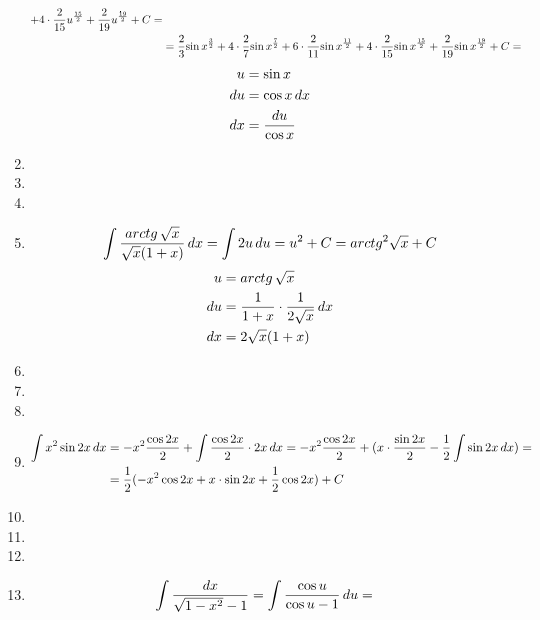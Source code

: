 \begin{enumerate}
\begin{paracol}{2}
\begin{align*}
      + 4\cdot \frac{2}{15}{u}^{\frac{15}{2}} + \frac{2}{19}{u}^{\frac{19}{2}} + C = \\
    &= \frac{2}{3}{\sin{x}}^{\frac{3}{2}} + 4\cdot \frac{2}{7}{\sin{x}}^{\frac{7}{2}} + 6\cdot \frac{2}{11}{\sin{x}}^{\frac{11}{2}}
      + 4\cdot \frac{2}{15}{\sin{x}}^{\frac{15}{2}} + \frac{2}{19}{\sin{x}}^{\frac{19}{2}} + C = \\
  \end{align*}
  \switchcolumn
  \begin{align*}
    u  &= \sin{x} \\
    du &= \cos{x}\,dx \\
    dx &= \dfrac{du}{\cos{x}}
  \end{align*}
\end{paracol}
  \item %
  \item %
  \item %
  \item %
\begin{paracol}{2}
  \begin{align*}
    \int\dfrac{arctg\,\sqrt{x}}{\sqrt{x} (1+x)}\,dx =
    \int 2u\,du = u^2 + C = arctg^2 \sqrt{x} + C
  \end{align*}
  \switchcolumn%
  \begin{align*}
    u  &= arctg\,\sqrt{x} \\
    du &= \frac{1}{1+x}\cdot \frac{1}{2\sqrt{x}} \,dx \\
    dx &= 2\sqrt{x}(1+x) 
  \end{align*}
\end{paracol}
  \item %
  \item %
  \item %
  \item %
\begin{align*}
  \int x^2 \sin{2x}\,dx 
  &= - x^2 \frac{\cos{2x}}{2} + \int\frac{\cos{2x}}{2}\cdot 2x\,dx =
     - x^2 \frac{\cos{2x}}{2} + (x\cdot \frac{\sin{2x}}{2} - \frac{1}{2}\int\sin{2x}\,dx) = \\
  &= \frac{1}{2}(-x^2 \cos{2x} + x\cdot \sin{2x} + \frac{1}{2}\cos{2x}) + C
\end{align*}
  \item %
  \item %
  \item %
  \item %
\begin{paracol}{2}
\begin{align*}
  &\int \frac{dx}{\sqrt{1-x^2}-1} = \int \frac{\cos{u}}{\cos{u}-1}\du =

\end{align*}
\end{paracol}
\end{enumerate}
